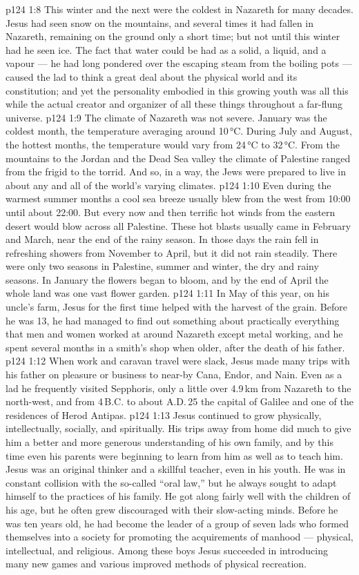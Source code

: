 \vs p124 1:8 \pc This winter and the next were the coldest in Nazareth for many decades. Jesus had seen snow on the mountains, and several times it had fallen in Nazareth, remaining on the ground only a short time; but not until this winter had he seen ice. The fact that water could be had as a solid, a liquid, and a vapour --- he had long pondered over the escaping steam from the boiling pots --- caused the lad to think a great deal about the physical world and its constitution; and yet the personality embodied in this growing youth was all this while the actual creator and organizer of all these things throughout a far\hyp{}flung universe.
\vs p124 1:9 The climate of Nazareth was not severe. January was the coldest month, the temperature averaging around 10\,°C. During July and August, the hottest months, the temperature would vary from 24\,°C to 32\,°C. From the mountains to the Jordan and the Dead Sea valley the climate of Palestine ranged from the frigid to the torrid. And so, in a way, the Jews were prepared to live in about any and all of the world’s varying climates.
\vs p124 1:10 Even during the warmest summer months a cool sea breeze usually blew from the west from 10:00 until about 22:00. But every now and then terrific hot winds from the eastern desert would blow across all Palestine. These hot blasts usually came in February and March, near the end of the rainy season. In those days the rain fell in refreshing showers from November to April, but it did not rain steadily. There were only two seasons in Palestine, summer and winter, the dry and rainy seasons. In January the flowers began to bloom, and by the end of April the whole land was one vast flower garden.
\vs p124 1:11 \pc In May of this year, on his uncle’s farm, Jesus for the first time helped with the harvest of the grain. Before he was 13, he had managed to find out something about practically everything that men and women worked at around Nazareth except metal working, and he spent several months in a smith’s shop when older, after the death of his father.
\vs p124 1:12 When work and caravan travel were slack, Jesus made many trips with his father on pleasure or business to near\hyp{}by Cana, Endor, and Nain. Even as a lad he frequently visited Sepphoris, only a little over 4.9\,km from Nazareth to the north\hyp{}west, and from 4\,B.C. to about A.D.\,25 the capital of Galilee and one of the residences of Herod Antipas.
\vs p124 1:13 Jesus continued to grow physically, intellectually, socially, and spiritually. His trips away from home did much to give him a better and more generous understanding of his own family, and by this time even his parents were beginning to learn from him as well as to teach him. Jesus was an original thinker and a skillful teacher, even in his youth. He was in constant collision with the so\hyp{}called “oral law,” but he always sought to adapt himself to the practices of his family. He got along fairly well with the children of his age, but he often grew discouraged with their slow\hyp{}acting minds. Before he was ten years old, he had become the leader of a group of seven lads who formed themselves into a society for promoting the acquirements of manhood --- physical, intellectual, and religious. Among these boys Jesus succeeded in introducing many new games and various improved methods of physical recreation.
